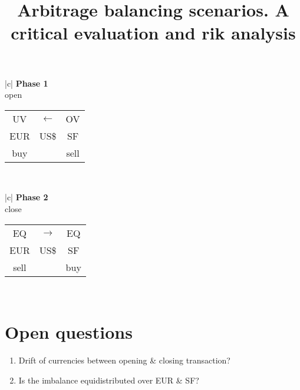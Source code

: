 \RequirePackage{times}
\RequirePackage{mathptm}
\renewcommand{\baselinestretch}{1.3}






\title{Arbitrage balancing scenarios. A critical evaluation and rik analysis}
\author{}
\date{ }
\maketitle

\begin{abstract}

\end{abstract}


\newpage

\begin{center}
\begin{tabular}{|c|}
\hline
{\bf \large Phase 1}  \\
open\\
\hline
\begin{tabular}{ccc}
UV&$\longleftarrow$&OV\\
EUR& US\$&SF\\
\hline
   buy && sell
\end{tabular}   \\
\hline
\end{tabular}
\end{center}

\begin{center}
\begin{tabular}{|c|}
\hline
{\bf \large Phase 2 } \\
close\\
\hline
\begin{tabular}{ccc}
EQ&$\longrightarrow$&EQ\\
EUR& US\$&SF\\
\hline
sell&&buy\\
\end{tabular} \\
\hline
\end{tabular}
\end{center}
\section*{Open questions}
\begin{enumerate}
\item
Drift of currencies between opening \& closing transaction?
\item
Is the imbalance equidistributed over EUR \& SF?
\end{enumerate}

